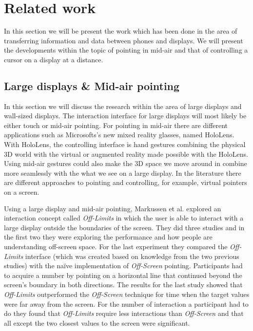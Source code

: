 \section{Related work} \label{sec:relatedwork}
In this section we will be present the work which has been done in the area of transferring information and data between phones and displays.
We will present the developments within the topic of pointing in mid-air and that of controlling a cursor on a display at a distance.

\subsection{Large displays \& Mid-air pointing} \label{sec:largeDisplayAirPointing}
In this section we will discuss the research within the area of large displays and wall-sized displays.
The interaction interface for large displays will most likely be either touch or mid-air pointing.
For pointing in mid-air there are different applications such as Microsofts's new mixed reality glasses, named HoloLens.
With HoloLens, the controlling interface is hand gestures combining the physical 3D world with the virtual or augmented reality made possible with the HoloLens.
Using mid-air gestures could also make the 3D space we move around in combine more seamlessly with the what we see on a large display.
In the literature there are different approaches to pointing and controlling, for example, virtual pointers on a screen. 

Using a large display and mid-air pointing, Markussen et al. \cite{Markussen:2016} explored an interaction concept called \emph{Off-Limits} in which the user is able to interact with a large display outside the boundaries of the screen.
They did three studies and in the first two they were exploring the performance and how people are understanding off-screen space.
For the last experiment they compared the \emph{Off-Limits} interface (which was created based on knowledge from the two previous studies) with the naïve implementation of \emph{Off-Screen} pointing.
Participants had to acquire a number by pointing on a horizontal line that continued beyond the screen's boundary in both directions.
The results for the last study showed that \emph{Off-Limits} outperformed the \emph{Off-Screen} technique for time when the target values were far away from the screen.
For the number of interaction a participant had to do they found that \emph{Off-Limits} require less interactions than \emph{Off-Screen} and that all except the two closest values to the screen were significant.

